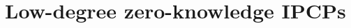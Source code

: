 \documentclass[english,12pt]{reedthesis}
\theoremstyle{plain}
\newtheorem{lemma}[lemma]{Lemma}
\theoremstyle{definition}
\theoremstyle{remark}
\begin{document}







\chapter{Low-degree zero-knowledge IPCPs}\label{chap:ipcp-zero-knowledge}
\end{document}
